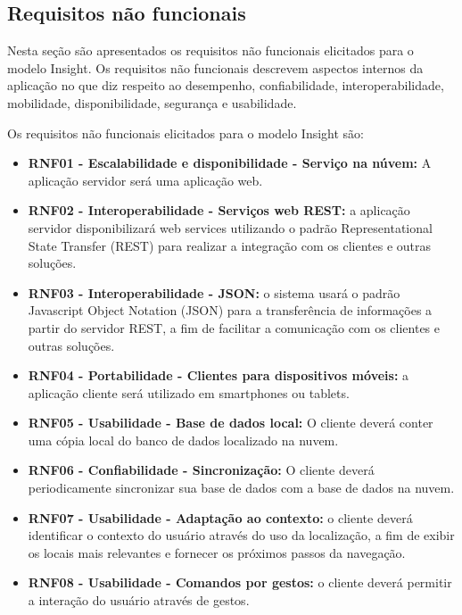 \documentclass[english,brazilian]{UNISINOSmonografia}
\begin{document}
\subsection{Requisitos não funcionais}
Nesta seção são apresentados os requisitos não funcionais elicitados para o modelo Insight. Os requisitos não funcionais descrevem aspectos internos da aplicação no que diz respeito ao desempenho, confiabilidade, interoperabilidade, mobilidade, disponibilidade, segurança e usabilidade.

Os requisitos não funcionais elicitados para o modelo Insight são:

\begin{itemize}
	\item \textbf{RNF01 - Escalabilidade e disponibilidade - Serviço na núvem:} A aplicação servidor será uma aplicação web.

	\item \textbf{RNF02 - Interoperabilidade - Serviços web REST:} a aplicação servidor disponibilizará web services utilizando o padrão Representational State Transfer (REST) para realizar a integração com os clientes e outras soluções.

	\item \textbf{RNF03 - Interoperabilidade - JSON:} o sistema usará o padrão Javascript Object Notation (JSON) para a transferência de informações a partir do servidor REST, a fim de facilitar a comunicação com os clientes e outras soluções.

	\item \textbf{RNF04 - Portabilidade - Clientes para dispositivos móveis:} a aplicação cliente será utilizado em smartphones ou tablets.

	\item \textbf{RNF05 - Usabilidade - Base de dados local:} O cliente deverá conter uma cópia local do banco de dados localizado na nuvem.

	\item \textbf{RNF06 - Confiabilidade - Sincronização:} O cliente deverá periodicamente sincronizar sua base de dados com a base de dados na nuvem.

	\item \textbf{RNF07 - Usabilidade - Adaptação ao contexto:} o cliente deverá identificar o contexto do usuário através do uso da localização, a fim de exibir os locais mais relevantes e fornecer os próximos passos da navegação.

	\item \textbf{RNF08 - Usabilidade - Comandos por gestos:} o cliente deverá permitir a interação do usuário através de gestos.


\end{itemize}
\end{document}
